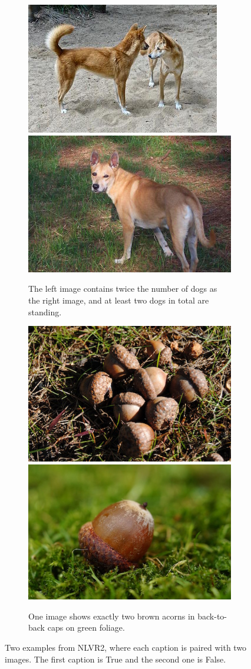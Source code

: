 \begin{figure}[ht]
  \centering
    \centering
    \begin{subfigure}[b]{0.49\linewidth}
    \centering
    \includegraphics[width=0.49\linewidth]{images/datasets/nlvr2_ex_0_img_0.jpg}
    \includegraphics[width=0.49\linewidth]{images/datasets/nlvr2_ex_0_img_1.jpg}
    \caption{The left image contains twice the number of dogs as the right image, and at least two dogs in total are standing.}
     \end{subfigure}
     \hfill
     \begin{subfigure}[b]{0.49\linewidth}
     \centering
    \includegraphics[width=0.49\linewidth]{images/datasets/nlvr2_ex_1_img_0.jpg}
    \includegraphics[width=0.49\linewidth]{images/datasets/nlvr2_ex_1_img_1.jpg}
    \caption{One image shows exactly two brown acorns in back-to-back caps on green foliage.}
     \end{subfigure}
    \caption{Two examples from NLVR2, where each caption is paired with two images. The first caption is True and the second one is False.}
    \label{fig:nlvr2_examples}
\end{figure}

